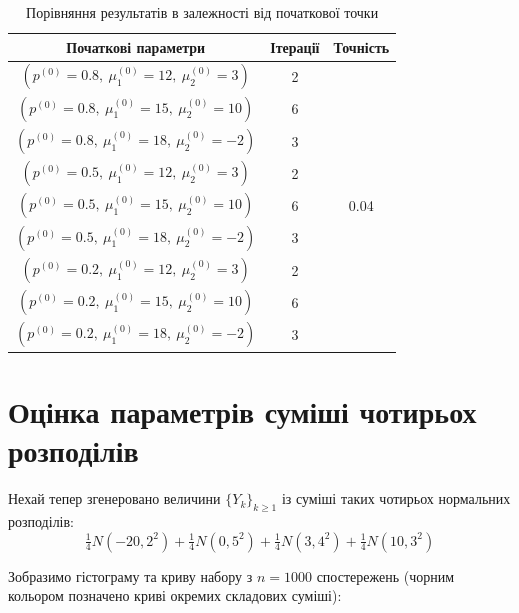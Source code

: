 \documentclass[a4paper,14pt]{extarticle} %
\numberwithin{equation}{section}
\begin{document}
\vspace{0.4cm}
\begin{table}[H]
    \begin{center}
        \begin{tabular}{||c|c|c||}
            \hline
            Початкові параметри & Ітерації & Точність \\
            \hline \hline
            $(p^{(0)}=0.8,\ \mu_1^{(0)}=12,\ \mu_2^{(0)}=3)$ & 2 & \multirow{9}{*}{0.04} \\
            $(p^{(0)}=0.8,\ \mu_1^{(0)}=15,\ \mu_2^{(0)}=10)$ & 6 & \\
            $(p^{(0)}=0.8,\ \mu_1^{(0)}=18,\ \mu_2^{(0)}=-2)$ & 3 & \\
            \cline{1-2}
            $(p^{(0)}=0.5,\ \mu_1^{(0)}=12,\ \mu_2^{(0)}=3)$ & 2 & \\
            $(p^{(0)}=0.5,\ \mu_1^{(0)}=15,\ \mu_2^{(0)}=10)$ & 6 & \\
            $(p^{(0)}=0.5,\ \mu_1^{(0)}=18,\ \mu_2^{(0)}=-2)$ & 3 & \\
            \cline{1-2}
            $(p^{(0)}=0.2,\ \mu_1^{(0)}=12,\ \mu_2^{(0)}=3)$ & 2 & \\
            $(p^{(0)}=0.2,\ \mu_1^{(0)}=15,\ \mu_2^{(0)}=10)$ & 6 & \\
            $(p^{(0)}=0.2,\ \mu_1^{(0)}=18,\ \mu_2^{(0)}=-2)$ & 3 & \\
            \hline
        \end{tabular}
        \caption{Порівняння результатів в залежності від початкової точки}
        \label{table: UKR F-test}
    \end{center}
\end{table}

\section*{Оцінка параметрів суміші чотирьох розподілів}

Нехай тепер згенеровано величини $\{Y_k\}_{k\geqslant 1}$ із суміші таких чотирьох нормальних розподілів:
\[ \tfrac{1}{4}N(-20,2^2) + \tfrac{1}{4}N(0,5^2) + \tfrac{1}{4}N(3,4^2) + \tfrac{1}{4}N(10,3^2) \]

Зобразимо гістограму та криву набору з $n=1000$ спостережень (чорним кольором позначено криві окремих складових суміші):
\end{document}
